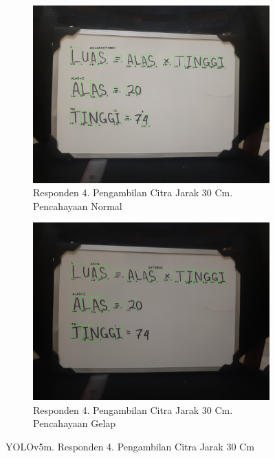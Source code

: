 \begin{figure}[H]
  \begin{subfigure}{.5\textwidth}
    \centering
    \captionsetup{width=.8\linewidth}
    \includegraphics[width=.8\linewidth]{gambar/yolov5m/responden4/hakimaxt30cm00-result.jpg}
    \caption{Responden 4. Pengambilan Citra Jarak 30 Cm. Pencahayaan Normal}
    \label{fig:mr4tcitra30cm}
  \end{subfigure}%
  \begin{subfigure}{.5\textwidth}
    \centering
    \captionsetup{width=.8\linewidth}
    \includegraphics[width=.8\linewidth]{gambar/yolov5m/responden4/hakimaxt30cm10-result.jpg}
    \caption{Responden 4. Pengambilan Citra Jarak 30 Cm. Pencahayaan Gelap}
    \label{fig:mr4gcitra30cm}
  \end{subfigure}
  \caption{YOLOv5m. Responden 4. Pengambilan Citra Jarak 30 Cm}
  \label{fig:mr4citra30cm}
\end{figure}


